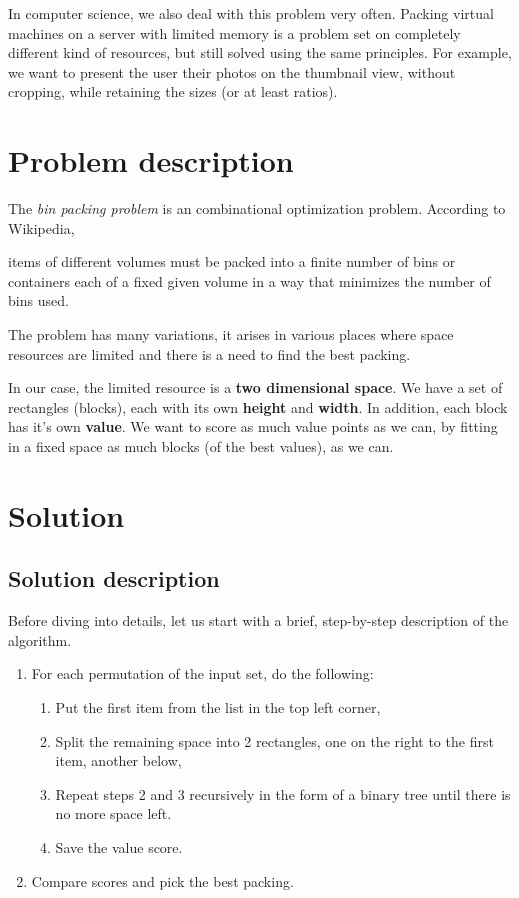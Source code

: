 In computer science, we also deal with this problem very often.
Packing virtual machines on a server with limited memory is a problem set
on completely different kind of resources,
but still solved using the same principles.
For example, we want to present the user their photos on the thumbnail view,
without cropping, while retaining the sizes (or at least ratios).

\section{Problem description}
The \textit{bin packing problem} is an combinational optimization problem.
According to Wikipedia\cite{wikibinpacking},
\begin{displayquote}
\textelp{} items of different volumes must be packed into a finite number of
bins or containers each of a fixed given volume in a way that minimizes the
number of bins used.
\end{displayquote}
The problem has many variations,
it arises in various places where space resources are limited and there is a
need to find the best packing.

In our case, the limited resource is a \textbf{two dimensional space}.
We have a set of rectangles (blocks),
each with its own \textbf{height} and \textbf{width}.
In addition, each block has it's own \textbf{value}.
We want to score as much value points as we can,
by fitting in a fixed space as much blocks (of the best values),
as we can.

\newpage
\section{Solution}
\subsection{Solution description}
Before diving into details, let us start with a brief,
step-by-step description of the algorithm.

\begin{enumerate}
  \item For each permutation of the input set, do the following:
  \begin{enumerate}
    \item Put the first item from the list in the top left corner,
    \item Split the remaining space into 2 rectangles, one on the right
      to the first item, another below,
    \item Repeat steps 2 and 3 recursively in the form of a binary tree
      until there is no more space left.
    \item Save the value score.
  \end{enumerate}
  \item Compare scores and pick the best packing. 
\end{enumerate}

